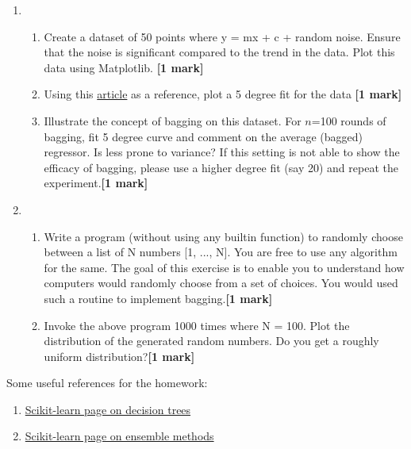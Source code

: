 \documentclass[colorlinks]{article}
\begin{document}
\begin{enumerate}
\item \begin{enumerate}
	\item Create a dataset of 50 points where y = mx + c +  random noise. Ensure that the noise is significant compared to the trend in the data. Plot this data using Matplotlib. \textbf{[1 mark]}
	\item Using this \href{https://www.scipy-lectures.org/intro/numpy/auto_examples/plot_polyfit.html}{article} as a reference, plot a 5 degree fit for the data \textbf{[1 mark]}
	\item Illustrate the concept of bagging on this dataset. For $n$=100 rounds of bagging, fit 5 degree curve and comment on the average (bagged) regressor. Is less prone to variance? If this setting is not able to show the efficacy of bagging, please use a higher degree fit (say 20) and repeat the experiment.\textbf{[1 mark]}
\end{enumerate}


\item \begin{enumerate}
	\item Write a program (without using any builtin function) to randomly choose between a list of N numbers [1, ..., N]. You are free to use any algorithm for the same. The goal of this exercise is to enable you to understand how computers would randomly choose from a set of choices. You would used such a routine to implement bagging.\textbf{[1 mark]} 
	\item Invoke the above program 1000 times where N = 100. Plot the distribution of the generated random numbers. Do you get a roughly uniform distribution?\textbf{[1 mark]} 
\end{enumerate}



	
	
	

\end{enumerate}


Some useful references for the homework:

\begin{enumerate}
	\item \href{https://scikit-learn.org/stable/modules/tree.html}{Scikit-learn page on decision trees}
		\item \href{https://scikit-learn.org/stable/modules/ensemble.html}{Scikit-learn page on ensemble methods}
\end{enumerate}
\end{document}
